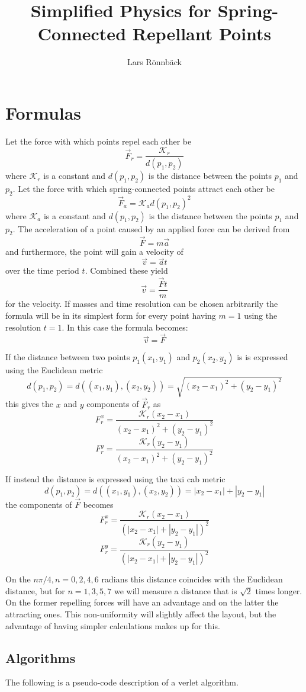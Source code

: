 \documentclass[11pt]{article} %
\title{Simplified Physics for Spring-Connected Repellant Points}
\author{Lars Rönnbäck}
\newcommand{\co}{\mathcal{K}}
\begin{document}
\maketitle

\section{Formulas}

Let the force with which points repel each other be $$\vec{F}_r = \frac{\co_r}{d(p_1, p_2)}$$ where $\co_r$ is a constant and $d(p_1, p_2)$ is the distance between the points $p_1$ and $p_2$. Let the force with which spring-connected points attract each other be $$\vec{F}_a = \co_a d(p_1, p_2)^2$$ where $\co_a$ is a constant and $d(p_1, p_2)$ is the distance between the points $p_1$ and $p_2$. The acceleration of a point caused by an applied force can be derived from $$\vec{F} = m\vec{a}$$ and furthermore, the point will gain a velocity of $$\vec{v} = \vec{a}t$$ over the time period $t$. Combined these yield $$\vec{v} = \frac{\vec{F}t}{m}$$ for the velocity. If masses and time resolution can be chosen arbitrarily the formula will be in its simplest form for every point having $m = 1$ using the resolution $t = 1$. In this case the formula becomes: $$\vec{v} = \vec{F}$$

\noindent
If the distance between two points $p_1(x_1, y_1)$ and $p_2(x_2, y_2)$ is is expressed using the Euclidean metric 
$$d(p_1, p_2) = d((x_1, y_1), (x_2, y_2)) = \sqrt{(x_2 - x_1)^2 + (y_2 - y_1)^2}$$
this gives the $x$ and $y$ components of $\vec{F}_r$ as
$$F^x_r = \frac{\co_r (x_2 - x_1)}{(x_2 - x_1)^2 + (y_2 - y_1)^2}$$
$$F^y_r = \frac{\co_r (y_2 - y_1)}{(x_2 - x_1)^2 + (y_2 - y_1)^2}$$

\noindent
If instead the distance is expressed using the taxi cab metric
$$d(p_1, p_2) = d((x_1, y_1), (x_2, y_2)) = |x_2 - x_1| + |y_2 - y_1|$$
the components of $\vec{F}$ becomes
$$F^x_r = \frac{\co_r (x_2 - x_1)}{(|x_2 - x_1| + |y_2 - y_1|)^2}$$
$$F^y_r = \frac{\co_r (y_2 - y_1)}{(|x_2 - x_1| + |y_2 - y_1|)^2}$$

\noindent
On the $n\pi/4, n = 0,2,4,6$ radians this distance coincides with the Euclidean distance, but for $n = 1,3,5,7$ we will measure a distance that is $\sqrt{2}$ times longer. On the former repelling forces will have an advantage and on the latter the attracting ones. This non-uniformity will slightly affect the layout, but the advantage of having simpler calculations makes up for this.


\subsection{Algorithms}
The following is a pseudo-code description of a verlet algorithm.
\end{document}
